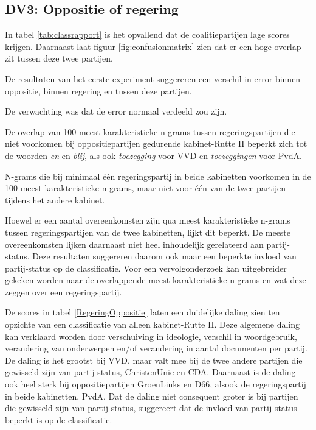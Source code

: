 \subsection{DV3: Oppositie of regering}
In tabel \ref{tab:classrapport} is het opvallend dat de coalitiepartijen lage scores krijgen. Daarnaast laat figuur \ref{fig:confusionmatrix} zien dat er een hoge overlap zit tussen deze twee partijen.\par
De resultaten van het eerste experiment suggereren een verschil in error binnen oppositie, binnen regering en tussen deze partijen.\par
De verwachting was dat de error normaal verdeeld zou zijn.\par
De overlap van 100 meest karakteristieke n-grams tussen regeringspartijen die niet voorkomen bij oppositiepartijen gedurende kabinet-Rutte II beperkt zich tot de woorden \textit{en} en \textit{blij}, als ook \textit{toezegging} voor VVD en \textit{toezeggingen} voor PvdA.\par
\begin{table}[H]
\label{tab:overlapkabinetten}
\caption{N-grams die bij minimaal één regeringspartij in beide kabinetten voorkomen in de 100 meest karakteristieke n-grams, maar niet voor één van de twee partijen tijdens het andere kabinet.}
\centering
 
\end{table}
Hoewel er een aantal overeenkomsten zijn qua meest karakteristieke n-grams tussen regeringspartijen van de twee kabinetten, lijkt dit beperkt. De meeste overeenkomsten lijken daarnaast niet heel inhoudelijk gerelateerd aan partij-status. Deze resultaten suggereren daarom ook maar een beperkte invloed van partij-status op de classificatie. Voor een vervolgonderzoek kan uitgebreider gekeken worden naar de overlappende meest karakteristieke n-grams en wat deze zeggen over een regeringspartij.\par
De scores in tabel \ref{RegeringOppositie} laten een duidelijke daling zien ten opzichte van een classificatie van alleen kabinet-Rutte II. Deze algemene daling kan verklaard worden door verschuiving in ideologie, verschil in woordgebruik, verandering van onderwerpen en/of verandering in aantal documenten per partij. De daling is het grootst bij VVD, maar valt mee bij de twee andere partijen die gewisseld zijn van partij-status, ChristenUnie en CDA. Daarnaast is de daling ook heel sterk bij oppositiepartijen GroenLinks en D66, alsook de regeringspartij in beide kabinetten, PvdA. Dat de daling niet consequent groter is bij partijen die gewisseld zijn van partij-status, suggereert dat de invloed van partij-status beperkt is op de classificatie.\par
